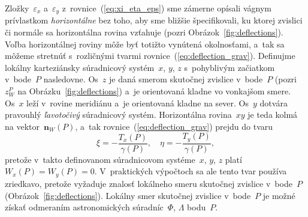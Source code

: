 \documentclass[a4paper,12pt]{book}
\let\vec\mathbf
\begin{document}
Zložky~$\varepsilon_x$ a~$\varepsilon_y$ z~rovnice~(\ref{eq:xi_eta_eps}) sme 
zámerne opísali vágnym prívlastkom \emph{horizontálne} bez toho, aby sme 
bližšie špecifikovali, ku ktorej zvislici či normále sa horizontálna rovina 
vzťahuje (pozri Obrázok~\ref{fig:deflections}).  Voľba horizontálnej roviny 
môže byť totižto vynútená okolnosťami, a~tak sa môžeme stretnúť s~rozličnými 
tvarmi rovnice~(\ref{eq:deflection_grav}).  Definujme lokálny karteziánsky 
súradnicový systém~$x$, $y$, $z$ s~pohyblivým začiatkom v~bode~$P$ nasledovne.  
Os~$z$ je daná smerom skutočnej zvislice v~bode~$P$ (pozri~$z_W^P$ na 
Obrázku~\ref{fig:deflections}) a~je orientovaná kladne vo vonkajšom smere.  
Os~$x$ leží v~rovine meridiánu a~je orientovaná kladne na sever.  Os~$y$ 
dotvára pravouhlý \emph{ľavotočivý} súradnicový systém.  Horizontálna 
rovina~$xy$ je teda kolmá na vektor~$\vec n_W(P)$, a~tak 
rovnice~(\ref{eq:deflection_grav}) prejdu do tvaru \parencite{Borre_chapter4}
%
\begin{equation}
\label{eq:deflection_grav_nat}
\xi = -\frac{T_x(P)}{\gamma(P)}{,} \quad \eta = -\frac{T_y(P)}{\gamma(P)}{,}
\end{equation}
%
pretože v~takto definovanom súradnicovom systéme~$x$, $y$, $z$ platí $W_x(P) 
= W_y(P) = 0$.  V~praktických výpočtoch sa ale tento tvar používa zriedkavo, 
pretože vyžaduje znalosť lokálneho smeru skutočnej zvislice v~bode~$P$ 
(Obrázok~\ref{fig:deflections}).  Lokálny smer skutočnej zvislice v~bode~$P$ je 
možné získať odmeraním astronomických súradníc~$\Phi$, $\Lambda$ bodu~$P$.
\end{document}
